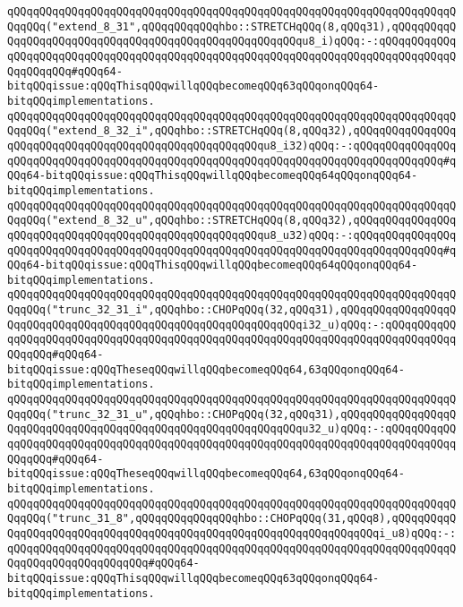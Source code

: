 \newline
\verb|qQQqqQQqqQQqqQQqqQQqqQQqqQQqqQQqqQQqqQQqqQQqqQQqqQQqqQQqqQQqqQQqqQQqqQQqqQQq("extend_8_31",qQQqqQQqqQQqhbo::STRETCHqQQq(8,qQQq31),qQQqqQQqqQQqqQQqqQQqqQQqqQQqqQQqqQQqqQQqqQQqqQQqqQQqqQQqu8_i)qQQq:-:qQQqqQQqqQQqqQQqqQQqqQQqqQQqqQQqqQQqqQQqqQQqqQQqqQQqqQQqqQQqqQQqqQQqqQQqqQQqqQQqqQQqqQQqqQQq#qQQq64-bitqQQqissue:qQQqThisqQQqwillqQQqbecomeqQQq63qQQqonqQQq64-bitqQQqimplementations.|\newline
\newline
\verb|qQQqqQQqqQQqqQQqqQQqqQQqqQQqqQQqqQQqqQQqqQQqqQQqqQQqqQQqqQQqqQQqqQQqqQQqqQQq("extend_8_32_i",qQQqhbo::STRETCHqQQq(8,qQQq32),qQQqqQQqqQQqqQQqqQQqqQQqqQQqqQQqqQQqqQQqqQQqqQQqqQQqqQQqu8_i32)qQQq:-:qQQqqQQqqQQqqQQqqQQqqQQqqQQqqQQqqQQqqQQqqQQqqQQqqQQqqQQqqQQqqQQqqQQqqQQqqQQqqQQqqQQq#qQQq64-bitqQQqissue:qQQqThisqQQqwillqQQqbecomeqQQq64qQQqonqQQq64-bitqQQqimplementations.|\newline
\verb|qQQqqQQqqQQqqQQqqQQqqQQqqQQqqQQqqQQqqQQqqQQqqQQqqQQqqQQqqQQqqQQqqQQqqQQqqQQq("extend_8_32_u",qQQqhbo::STRETCHqQQq(8,qQQq32),qQQqqQQqqQQqqQQqqQQqqQQqqQQqqQQqqQQqqQQqqQQqqQQqqQQqqQQqu8_u32)qQQq:-:qQQqqQQqqQQqqQQqqQQqqQQqqQQqqQQqqQQqqQQqqQQqqQQqqQQqqQQqqQQqqQQqqQQqqQQqqQQqqQQqqQQq#qQQq64-bitqQQqissue:qQQqThisqQQqwillqQQqbecomeqQQq64qQQqonqQQq64-bitqQQqimplementations.|\newline
\newline
\verb|qQQqqQQqqQQqqQQqqQQqqQQqqQQqqQQqqQQqqQQqqQQqqQQqqQQqqQQqqQQqqQQqqQQqqQQqqQQq("trunc_32_31_i",qQQqhbo::CHOPqQQq(32,qQQq31),qQQqqQQqqQQqqQQqqQQqqQQqqQQqqQQqqQQqqQQqqQQqqQQqqQQqqQQqqQQqqQQqi32_u)qQQq:-:qQQqqQQqqQQqqQQqqQQqqQQqqQQqqQQqqQQqqQQqqQQqqQQqqQQqqQQqqQQqqQQqqQQqqQQqqQQqqQQqqQQqqQQq#qQQq64-bitqQQqissue:qQQqTheseqQQqwillqQQqbecomeqQQq64,63qQQqonqQQq64-bitqQQqimplementations.|\newline
\verb|qQQqqQQqqQQqqQQqqQQqqQQqqQQqqQQqqQQqqQQqqQQqqQQqqQQqqQQqqQQqqQQqqQQqqQQqqQQq("trunc_32_31_u",qQQqhbo::CHOPqQQq(32,qQQq31),qQQqqQQqqQQqqQQqqQQqqQQqqQQqqQQqqQQqqQQqqQQqqQQqqQQqqQQqqQQqqQQqu32_u)qQQq:-:qQQqqQQqqQQqqQQqqQQqqQQqqQQqqQQqqQQqqQQqqQQqqQQqqQQqqQQqqQQqqQQqqQQqqQQqqQQqqQQqqQQqqQQq#qQQq64-bitqQQqissue:qQQqTheseqQQqwillqQQqbecomeqQQq64,63qQQqonqQQq64-bitqQQqimplementations.|\newline
\newline
\verb|qQQqqQQqqQQqqQQqqQQqqQQqqQQqqQQqqQQqqQQqqQQqqQQqqQQqqQQqqQQqqQQqqQQqqQQqqQQq("trunc_31_8",qQQqqQQqqQQqqQQqhbo::CHOPqQQq(31,qQQq8),qQQqqQQqqQQqqQQqqQQqqQQqqQQqqQQqqQQqqQQqqQQqqQQqqQQqqQQqqQQqqQQqqQQqi_u8)qQQq:-:qQQqqQQqqQQqqQQqqQQqqQQqqQQqqQQqqQQqqQQqqQQqqQQqqQQqqQQqqQQqqQQqqQQqqQQqqQQqqQQqqQQqqQQqqQQq#qQQq64-bitqQQqissue:qQQqThisqQQqwillqQQqbecomeqQQq63qQQqonqQQq64-bitqQQqimplementations.|\newline

